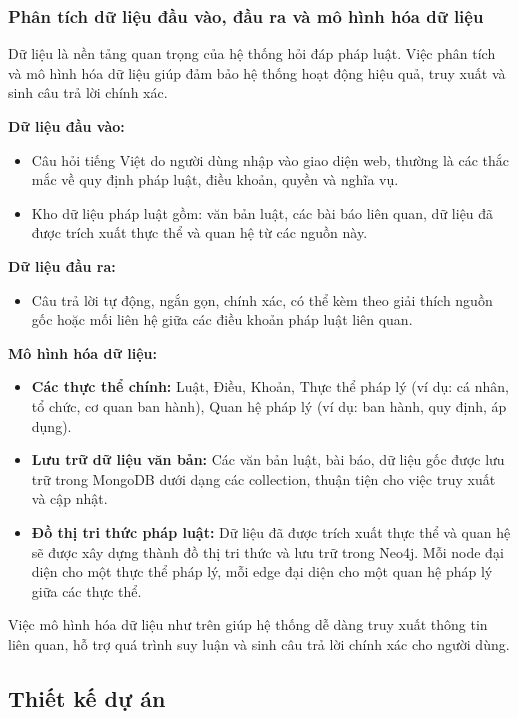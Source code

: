 \documentclass[a4paper]{article}
\begin{document}
\subsubsection{Phân tích dữ liệu đầu vào, đầu ra và mô hình hóa dữ liệu}
Dữ liệu là nền tảng quan trọng của hệ thống hỏi đáp pháp luật. Việc phân tích và mô hình hóa dữ liệu giúp đảm bảo hệ thống hoạt động hiệu quả, truy xuất và sinh câu trả lời chính xác.

\textbf{Dữ liệu đầu vào:}
\begin{itemize}
    \item Câu hỏi tiếng Việt do người dùng nhập vào giao diện web, thường là các thắc mắc về quy định pháp luật, điều khoản, quyền và nghĩa vụ.
    \item Kho dữ liệu pháp luật gồm: văn bản luật, các bài báo liên quan, dữ liệu đã được trích xuất thực thể và quan hệ từ các nguồn này.
\end{itemize}

\textbf{Dữ liệu đầu ra:}
\begin{itemize}
    \item Câu trả lời tự động, ngắn gọn, chính xác, có thể kèm theo giải thích nguồn gốc hoặc mối liên hệ giữa các điều khoản pháp luật liên quan.
\end{itemize}

\textbf{Mô hình hóa dữ liệu:}
\begin{itemize}
    \item \textbf{Các thực thể chính:} Luật, Điều, Khoản, Thực thể pháp lý (ví dụ: cá nhân, tổ chức, cơ quan ban hành), Quan hệ pháp lý (ví dụ: ban hành, quy định, áp dụng).
    \item \textbf{Lưu trữ dữ liệu văn bản:} Các văn bản luật, bài báo, dữ liệu gốc được lưu trữ trong MongoDB dưới dạng các collection, thuận tiện cho việc truy xuất và cập nhật.
    \item \textbf{Đồ thị tri thức pháp luật:} Dữ liệu đã được trích xuất thực thể và quan hệ sẽ được xây dựng thành đồ thị tri thức và lưu trữ trong Neo4j. Mỗi node đại diện cho một thực thể pháp lý, mỗi edge đại diện cho một quan hệ pháp lý giữa các thực thể.
\end{itemize}

Việc mô hình hóa dữ liệu như trên giúp hệ thống dễ dàng truy xuất thông tin liên quan, hỗ trợ quá trình suy luận và sinh câu trả lời chính xác cho người dùng.
\subsection{Thiết kế dự án}
\end{document}
